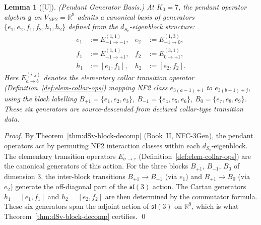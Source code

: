 \documentclass[12pt,oneside]{amsbook}
\theoremstyle{plain}
\newtheorem{lemma}[theorem]{Lemma}
\theoremstyle{definition}
\theoremstyle{remark}
\newcommand{\status}[1]{\textup{[#1]}}
\begin{document}
\begin{lemma}[\status{U}]\label{lem:pendant-basis}
\textup{(Pendant Generator Basis.)}
At $K_0=7$, the pendant operator algebra $\mathfrak{g}$ on
$V_{\mathrm{NF2}} = \mathbb{R}^9$ admits a canonical basis of
generators $\{e_1, e_2, f_1, f_2, h_1, h_2\}$ defined from the
$d_{S_v}$-eigenblock structure:
\begin{align*}
 e_1 &:= E_{+1 \to -1}^{(1,1)}, &
 e_2 &:= E_{+1 \to 0}^{(1,3)}, \\
 f_1 &:= E_{-1 \to +1}^{(1,1)}, &
 f_2 &:= E_{0 \to +1}^{(3,1)}, \\
 h_1 &:= [e_1, f_1], &
 h_2 &:= [e_2, f_2].
\end{align*}
Here $E_{a \to b}^{(i,j)}$ denotes the elementary collar transition
operator (Definition~\ref{def:elem-collar-ops}) mapping NF2 class
$e_{3(a-1)+i}$ to $e_{3(b-1)+j}$, using the block labelling
$B_{+1}=\{e_1,e_2,e_3\}$, $B_{-1}=\{e_4,e_5,e_6\}$,
$B_0=\{e_7,e_8,e_9\}$. These six generators are source-descended
from declared collar-type transition data.
\end{lemma}

\begin{proof}
By Theorem~\ref{thm:dSv-block-decomp} (Book~II, NFC-3Gen),
the pendant operators act by permuting NF2 interaction classes
within each $d_{S_v}$-eigenblock. The elementary transition
operators $E_{\sigma \to \tau}$ (Definition~\ref{def:elem-collar-ops})
are the canonical generators of this action. For the three blocks
$B_{+1}$, $B_{-1}$, $B_0$ of dimension 3, the inter-block
transitions $B_{+1} \to B_{-1}$ (via $e_1$) and $B_{+1} \to B_0$
(via $e_2$) generate the off-diagonal part of the $\mathfrak{sl}(3)$
action. The Cartan generators $h_1 = [e_1,f_1]$ and
$h_2 = [e_2,f_2]$ are then determined by the commutator formula.
These six generators span the adjoint action of $\mathfrak{sl}(3)$
on $\mathbb{R}^9$, which is what Theorem~\ref{thm:dSv-block-decomp}
certifies. \qed
\end{proof}
\end{document}
